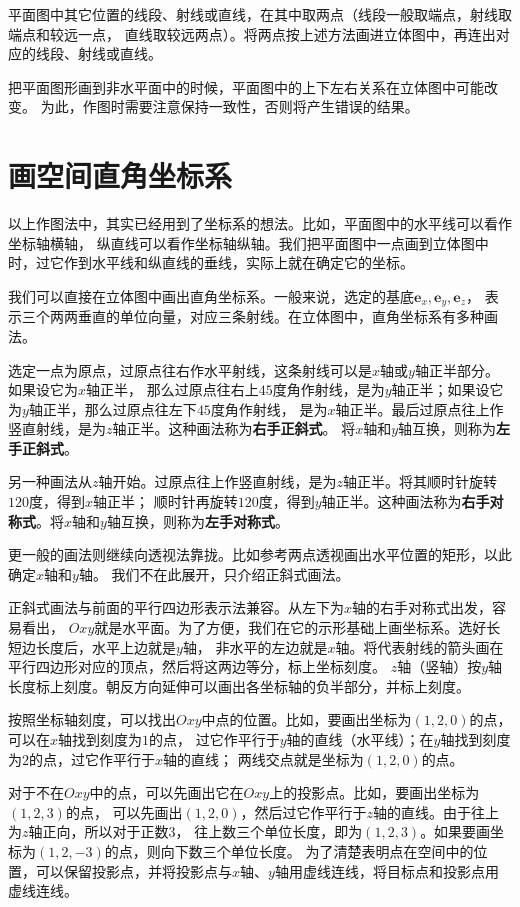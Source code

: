 \documentclass[12pt,UTF8]{ctexbook}
\begin{document}
\begin{appendix}
平面图中其它位置的线段、射线或直线，在其中取两点（线段一般取端点，射线取端点和较远一点，
直线取较远两点）。将两点按上述方法画进立体图中，再连出对应的线段、射线或直线。

把平面图形画到非水平面中的时候，平面图中的上下左右关系在立体图中可能改变。
为此，作图时需要注意保持一致性，否则将产生错误的结果。

\section{画空间直角坐标系}

以上作图法中，其实已经用到了坐标系的想法。比如，平面图中的水平线可以看作坐标轴横轴，
纵直线可以看作坐标轴纵轴。我们把平面图中一点画到立体图中时，过它作到水平线和纵直线的垂线，实际上就在确定它的坐标。

我们可以直接在立体图中画出直角坐标系。一般来说，选定的基底$\mathbf{e}_x,\mathbf{e}_y,\mathbf{e}_z$，
表示三个两两垂直的单位向量，对应三条射线。在立体图中，直角坐标系有多种画法。

选定一点为原点，过原点往右作水平射线，这条射线可以是$x$轴或$y$轴正半部分。如果设它为$x$轴正半，
那么过原点往右上$45$度角作射线，是为$y$轴正半；如果设它为$y$轴正半，那么过原点往左下$45$度角作射线，
是为$x$轴正半。最后过原点往上作竖直射线，是为$z$轴正半。这种画法称为\textbf{右手正斜式}。
将$x$轴和$y$轴互换，则称为\textbf{左手正斜式}。

另一种画法从$z$轴开始。过原点往上作竖直射线，是为$z$轴正半。将其顺时针旋转$120$度，得到$x$轴正半；
顺时针再旋转$120$度，得到$y$轴正半。这种画法称为\textbf{右手对称式}。将$x$轴和$y$轴互换，则称为\textbf{左手对称式}。

更一般的画法则继续向透视法靠拢。比如参考两点透视画出水平位置的矩形，以此确定$x$轴和$y$轴。
我们不在此展开，只介绍正斜式画法。

正斜式画法与前面的平行四边形表示法兼容。从左下为$x$轴的右手对称式出发，容易看出，
$Oxy$就是水平面。为了方便，我们在它的示形基础上画坐标系。选好长短边长度后，水平上边就是$y$轴，
非水平的左边就是$x$轴。将代表射线的箭头画在平行四边形对应的顶点，然后将这两边等分，标上坐标刻度。
$z$轴（竖轴）按$y$轴长度标上刻度。朝反方向延伸可以画出各坐标轴的负半部分，并标上刻度。

按照坐标轴刻度，可以找出$Oxy$中点的位置。比如，要画出坐标为$(1,2,0)$的点，可以在$x$轴找到刻度为$1$的点，
过它作平行于$y$轴的直线（水平线）；在$y$轴找到刻度为$2$的点，过它作平行于$x$轴的直线；
两线交点就是坐标为$(1,2,0)$的点。

对于不在$Oxy$中的点，可以先画出它在$Oxy$上的投影点。比如，要画出坐标为$(1,2,3)$的点，
可以先画出$(1,2,0)$，然后过它作平行于$z$轴的直线。由于往上为$z$轴正向，所以对于正数$3$，
往上数三个单位长度，即为$(1,2,3)$。如果要画坐标为$(1,2,-3)$的点，则向下数三个单位长度。
为了清楚表明点在空间中的位置，可以保留投影点，并将投影点与$x$轴、$y$轴用虚线连线，将目标点和投影点用虚线连线。


\end{appendix}
\end{document}
